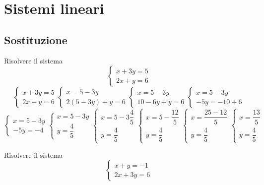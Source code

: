 \chapter{Sistemi lineari}
\section{Sostituzione}
\tcbstartrecording
\begin{exercise}{}
Risolvere il sistema 
\[
\begin{cases}
	x+3y=5\\
	2x+y=6
\end{cases}
\]
	\tcblower
\[
\begin{cases}
	x+3y=5\\
	2x+y=6
\end{cases}
\begin{cases}
	x=5-3y\\
	2(5-3y)+y=6
\end{cases}
\begin{cases}
	x=5-3y\\
	10-6y+y=6
\end{cases}
\begin{cases}
	x=5-3y\\
	-5y=-10+6
\end{cases}
\]
\[
\begin{cases}
		x=5-3y\\
	-5y=-4
\end{cases}
\begin{cases}
	x=5-3y\\
	y=\dfrac{4}{5}
\end{cases}
\begin{cases}
	x=5-3\dfrac{4}{5}\\
	y=\dfrac{4}{5}
\end{cases}
\begin{cases}
	x=5-\dfrac{12}{5}\\
	y=\dfrac{4}{5}
\end{cases}
\begin{cases}
	x=\dfrac{25-12}{5}\\
	y=\dfrac{4}{5}
\end{cases}
\begin{cases}
	x=\dfrac{13}{5}\\
	y=\dfrac{4}{5}
\end{cases}
\]
\end{exercise}
\begin{exercise}[no solution]
Risolvere il sistema 
\[
\begin{cases}
	x+y=-1\\
	2x+3y=6
\end{cases}
\]
\end{exercise}
